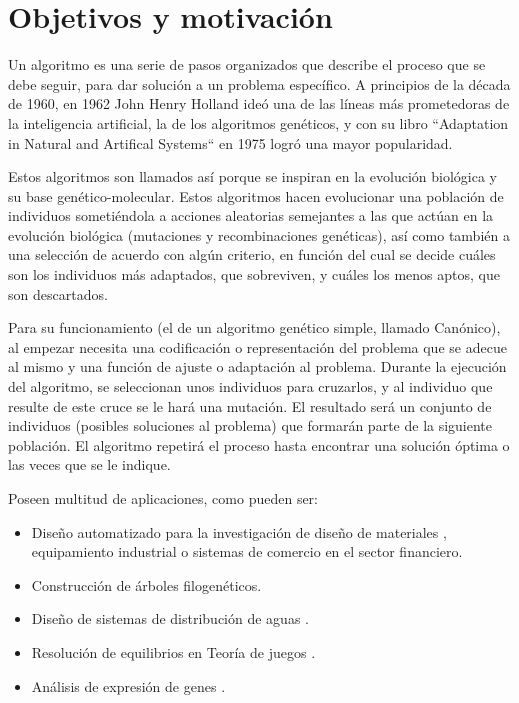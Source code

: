 \chapter{Objetivos y motivación}


\bigskip
Un algoritmo es una serie de pasos organizados que describe el proceso que se debe seguir, para dar solución a un problema específico. A principios de la década de 1960, en 1962 John Henry Holland ideó una de las líneas más prometedoras de la inteligencia artificial, la de los algoritmos genéticos, y con su libro ``Adaptation in Natural and Artifical Systems`` en 1975 logró una mayor popularidad. 

Estos algoritmos son llamados así porque se inspiran en la evolución biológica y su base genético-molecular. Estos algoritmos hacen evolucionar una población de individuos sometiéndola a acciones aleatorias semejantes a las que actúan en la evolución biológica (mutaciones y recombinaciones genéticas), así como también a una selección de acuerdo con algún criterio, en función del cual se decide cuáles son los individuos más adaptados, que sobreviven, y cuáles los menos aptos, que son descartados.

\bigskip
Para su funcionamiento (el de un algoritmo genético simple, llamado Canónico), al empezar necesita una codificación o representación del problema que se adecue al mismo y una función de ajuste o adaptación al problema. Durante la ejecución del algoritmo, se seleccionan unos individuos para cruzarlos, y  al individuo que resulte de este cruce se le hará una mutación. El resultado será un conjunto de individuos (posibles soluciones al problema) que formarán parte de la siguiente población. El algoritmo repetirá el proceso hasta encontrar una solución óptima o las veces que se le indique.

\bigskip
Poseen multitud de aplicaciones, como pueden ser:

\begin{itemize}
	\item Diseño automatizado para la investigación de diseño de materiales \cite{5586262}, equipamiento industrial o sistemas de comercio en el sector financiero.
	\item Construcción de árboles filogenéticos. \cite{arbolesfilogeneticos}
	\item Diseño de sistemas de distribución de aguas \cite{ditribucionagua}. 
	\item Resolución de equilibrios en Teoría de juegos \cite{teoriajuegos}.
	\item Análisis de expresión de genes \cite{analisisexpresiongenes}.
\end{itemize}

